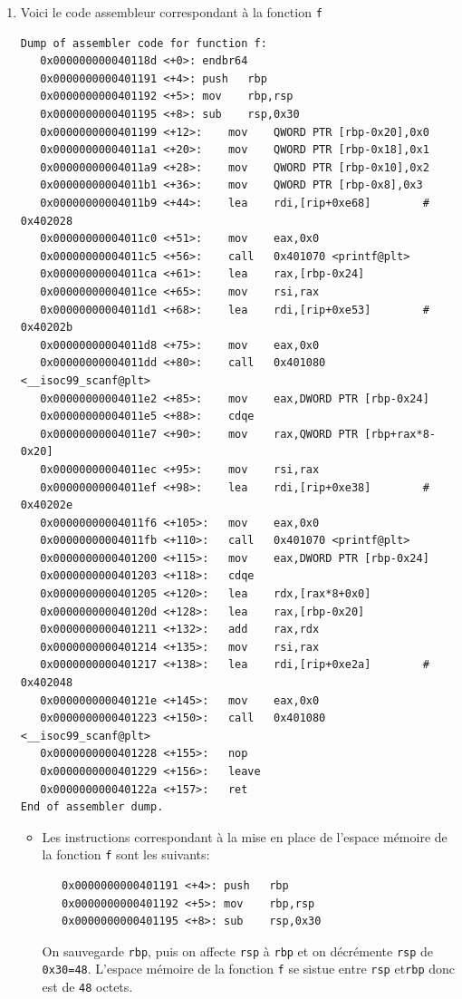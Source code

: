 \documentclass[a4paper,9pt]{article}
\newenvironment{terminal}{\color{black}\begin{snugshade*}}
{\end{snugshade*}\color{black}}
\theoremstyle{plain}
\theoremstyle{definition}
\begin{document}
\begin{correction}
  \begin{enumerate}
  \item Voici le code assembleur correspondant à la fonction \verb|f|
\begin{terminal}\small
\begin{verbatim}
Dump of assembler code for function f:
   0x000000000040118d <+0>:	endbr64 
   0x0000000000401191 <+4>:	push   rbp
   0x0000000000401192 <+5>:	mov    rbp,rsp
   0x0000000000401195 <+8>:	sub    rsp,0x30
   0x0000000000401199 <+12>:	mov    QWORD PTR [rbp-0x20],0x0
   0x00000000004011a1 <+20>:	mov    QWORD PTR [rbp-0x18],0x1
   0x00000000004011a9 <+28>:	mov    QWORD PTR [rbp-0x10],0x2
   0x00000000004011b1 <+36>:	mov    QWORD PTR [rbp-0x8],0x3
   0x00000000004011b9 <+44>:	lea    rdi,[rip+0xe68]        # 0x402028
   0x00000000004011c0 <+51>:	mov    eax,0x0
   0x00000000004011c5 <+56>:	call   0x401070 <printf@plt>
   0x00000000004011ca <+61>:	lea    rax,[rbp-0x24]
   0x00000000004011ce <+65>:	mov    rsi,rax
   0x00000000004011d1 <+68>:	lea    rdi,[rip+0xe53]        # 0x40202b
   0x00000000004011d8 <+75>:	mov    eax,0x0
   0x00000000004011dd <+80>:	call   0x401080 <__isoc99_scanf@plt>
   0x00000000004011e2 <+85>:	mov    eax,DWORD PTR [rbp-0x24]
   0x00000000004011e5 <+88>:	cdqe   
   0x00000000004011e7 <+90>:	mov    rax,QWORD PTR [rbp+rax*8-0x20]
   0x00000000004011ec <+95>:	mov    rsi,rax
   0x00000000004011ef <+98>:	lea    rdi,[rip+0xe38]        # 0x40202e
   0x00000000004011f6 <+105>:	mov    eax,0x0
   0x00000000004011fb <+110>:	call   0x401070 <printf@plt>
   0x0000000000401200 <+115>:	mov    eax,DWORD PTR [rbp-0x24]
   0x0000000000401203 <+118>:	cdqe   
   0x0000000000401205 <+120>:	lea    rdx,[rax*8+0x0]
   0x000000000040120d <+128>:	lea    rax,[rbp-0x20]
   0x0000000000401211 <+132>:	add    rax,rdx
   0x0000000000401214 <+135>:	mov    rsi,rax
   0x0000000000401217 <+138>:	lea    rdi,[rip+0xe2a]        # 0x402048
   0x000000000040121e <+145>:	mov    eax,0x0
   0x0000000000401223 <+150>:	call   0x401080 <__isoc99_scanf@plt>
   0x0000000000401228 <+155>:	nop
   0x0000000000401229 <+156>:	leave  
   0x000000000040122a <+157>:	ret    
End of assembler dump.
\end{verbatim}
\end{terminal}
\begin{itemize}
\item Les instructions correspondant à la mise en place de l'espace mémoire de la fonction \verb|f| sont les suivants:
\begin{terminal}\small
\begin{verbatim}
   0x0000000000401191 <+4>:	push   rbp
   0x0000000000401192 <+5>:	mov    rbp,rsp
   0x0000000000401195 <+8>:	sub    rsp,0x30
\end{verbatim}
\end{terminal}
On sauvegarde \verb|rbp|, puis on affecte \verb|rsp| à \verb|rbp| et on décrémente \verb|rsp| de \verb|0x30=48|. 
L'espace mémoire de la fonction \verb|f| se sistue entre \verb|rsp| et\verb|rbp| donc est de \verb|48| octets.


\end{itemize}
\end{enumerate}
\end{correction}
\end{document}
